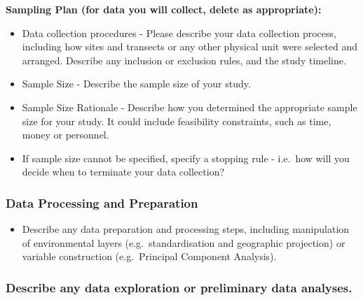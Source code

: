 \documentclass[
]{article}
\providecommand{\tightlist}{%
  \setlength{\itemsep}{0pt}\setlength{\parskip}{0pt}}
\begin{document}
\begin{tcolorbox}
\textbf{Sampling Plan (for data you will collect, delete as
appropriate):}

\begin{itemize}
\tightlist
\item[$\square$]
  Data collection procedures - Please describe your data collection
  process, including how sites and transects or any other physical unit
  were selected and arranged. Describe any inclusion or exclusion rules,
  and the study timeline.
\item[$\square$]
  Sample Size - Describe the sample size of your study.
\item[$\square$]
  Sample Size Rationale - Describe how you determined the appropriate
  sample size for your study. It could include feasibility constraints,
  such as time, money or personnel.
\item[$\square$]
  If sample size cannot be specified, specify a stopping rule - i.e.~how
  will you decide when to terminate your data collection?
\end{itemize}

\end{tcolorbox}

\subsubsection{Data Processing and
Preparation}\label{data-processing-and-preparation}

\begin{tcolorbox}[enhanced jigsaw, opacitybacktitle=0.6, bottomrule=.15mm, leftrule=.75mm, rightrule=.15mm, colbacktitle=quarto-callout-caution-color!10!white, toprule=.15mm, titlerule=0mm, left=2mm, colframe=quarto-callout-caution-color-frame, breakable, title=\textcolor{quarto-callout-caution-color}{\faFire}\hspace{0.5em}{Preregistration Item}, opacityback=0, coltitle=black, bottomtitle=1mm, colback=white, toptitle=1mm, arc=.35mm]

\begin{itemize}
\tightlist
\item[$\square$]
  Describe any data preparation and processing steps, including
  manipulation of environmental layers (e.g.~standardisation and
  geographic projection) or variable construction (e.g.~Principal
  Component Analysis).
\end{itemize}

\end{tcolorbox}

\subsubsection{Describe any data exploration or preliminary data
analyses.}\label{describe-any-data-exploration-or-preliminary-data-analyses.}
\end{document}
